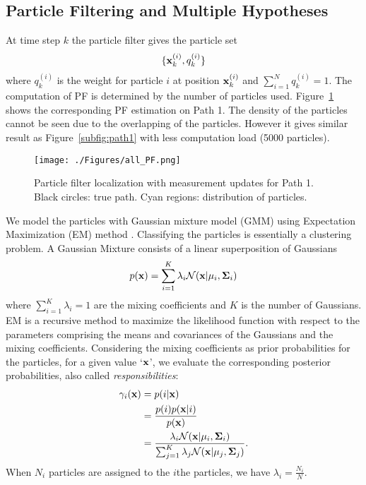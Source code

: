 \subsection{Particle Filtering and Multiple Hypotheses}

At time step $k$ the particle filter gives the particle set
\begin{equation}
\{{\bf x}_k^{(i)},q_k^{(i)}\}
\end{equation}
where $q_k^{(i)}$ is the weight for particle $i$ at position ${\bf x}_k^{(i)}$ and $\sum_{i=1}^Nq_k^{(i)}=1$. The computation of PF is determined by the number of particles used. Figure~\ref{fig:all_PF} shows the corresponding PF estimation on Path 1. The density of the particles cannot be seen due to the overlapping of the particles. However it gives similar result as Figure~\ref{subfig:path1} with less computation load (5000 particles).

\begin{figure}[htpb]
\centering
    \texttt{[image: ./Figures/all\_PF.png]}
            \caption{Particle filter localization with measurement updates for Path 1. Black circles: true path. Cyan regions: distribution of particles.}
                        \label{fig:all_PF}
\end{figure}

We model the particles with  Gaussian mixture model (GMM) using Expectation Maximization (EM) method \cite{Bishopbook}. Classifying the particles is essentially a clustering problem. A Gaussian Mixture consists of a linear superposition of Gaussians
\begin{equation}
    p({\bf x})=\sum_{i=1}^K\lambda_i\mathcal{N}({\bf x}|{\bf\mu}_i,{\bf \Sigma}_i)
\end{equation}
where $\sum_{i=1}^K\lambda_i=1$ are the mixing coefficients and $K$ is the number of Gaussians. EM is a recursive method to maximize the likelihood function with respect to the parameters comprising the means and covariances of the Gaussians and the mixing coefficients. Considering the mixing coefficients as prior probabilities for the particles, for a given value `${\bf x}$', we evaluate the corresponding posterior probabilities, also called \textit{responsibilities}:
\begin{equation}
\begin{split}
    \gamma_i({\bf x})&=p(i|{\bf x}) \\
    &=\frac{p(i)p({\bf x}|i)}{p(\bf x)}\\
    &=\frac{\lambda_i\mathcal{N}({\bf x}|{\bf\mu}_i,{\bf \Sigma}_i)}{\sum_{j=1}^K\lambda_j\mathcal{N}({\bf x}|{\bf\mu}_j,{\bf \Sigma}_j)}. \\
\end{split}
\end{equation}
When $N_i$ particles are assigned to the $i$the particles, we have $\lambda_i=\frac{N_i}{N}$.

